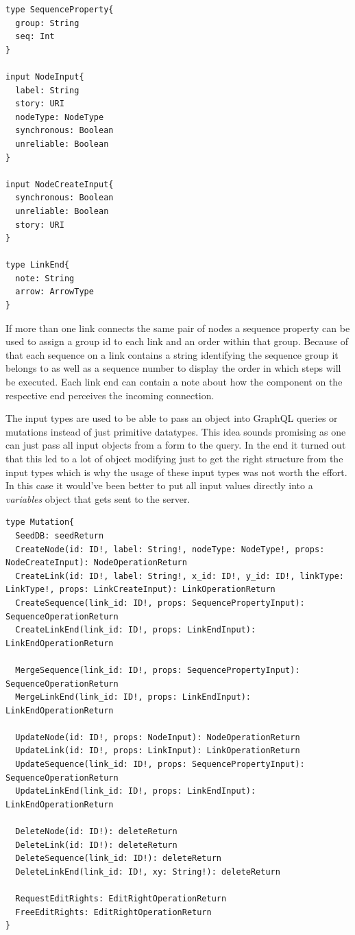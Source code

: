 \begin{lstlisting}[caption={Input Type Definitions}]
type SequenceProperty{
  group: String
  seq: Int
}

input NodeInput{
  label: String
  story: URI
  nodeType: NodeType
  synchronous: Boolean
  unreliable: Boolean
}

input NodeCreateInput{
  synchronous: Boolean
  unreliable: Boolean
  story: URI
}

type LinkEnd{
  note: String
  arrow: ArrowType
}
\end{lstlisting}
If more than one link connects the same pair of nodes a sequence property can be used to assign a group id to each link and an order within that group. Because of that each sequence on a link contains a string identifying the sequence group it belongs to as well as a sequence number to display the order in which steps will be executed. Each link end can contain a note about how the component on the respective end perceives the incoming connection.

The input types are used to be able to pass an object into GraphQL queries or mutations instead of just primitive datatypes. This idea sounds promising as one can just pass all input objects from a form to the query. In the end it turned out that this led to a lot of object modifying just to get the right structure from the input types which is why the usage of these input types was not worth the effort. In this case it would've been better to put all input values directly into a \emph{variables} object that gets sent to the server.

\newpage
\begin{lstlisting}[caption={Mutation Type Definition},label={mutations}]
type Mutation{
  SeedDB: seedReturn
  CreateNode(id: ID!, label: String!, nodeType: NodeType!, props: NodeCreateInput): NodeOperationReturn
  CreateLink(id: ID!, label: String!, x_id: ID!, y_id: ID!, linkType: LinkType!, props: LinkCreateInput): LinkOperationReturn
  CreateSequence(link_id: ID!, props: SequencePropertyInput): SequenceOperationReturn
  CreateLinkEnd(link_id: ID!, props: LinkEndInput): LinkEndOperationReturn

  MergeSequence(link_id: ID!, props: SequencePropertyInput): SequenceOperationReturn
  MergeLinkEnd(link_id: ID!, props: LinkEndInput): LinkEndOperationReturn

  UpdateNode(id: ID!, props: NodeInput): NodeOperationReturn
  UpdateLink(id: ID!, props: LinkInput): LinkOperationReturn
  UpdateSequence(link_id: ID!, props: SequencePropertyInput): SequenceOperationReturn
  UpdateLinkEnd(link_id: ID!, props: LinkEndInput): LinkEndOperationReturn

  DeleteNode(id: ID!): deleteReturn
  DeleteLink(id: ID!): deleteReturn
  DeleteSequence(link_id: ID!): deleteReturn
  DeleteLinkEnd(link_id: ID!, xy: String!): deleteReturn

  RequestEditRights: EditRightOperationReturn
  FreeEditRights: EditRightOperationReturn
}
\end{lstlisting}

